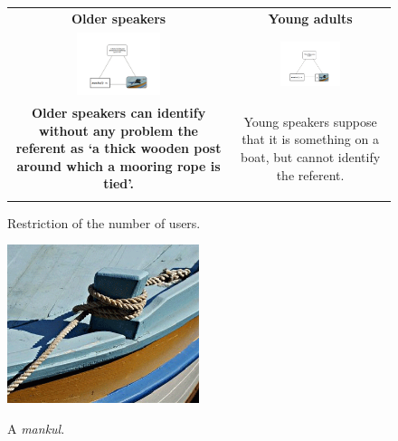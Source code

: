\documentclass[output=paper]{LSP/langsci}
\begin{document}
\begin{figure}
\begin{tabular}{cc}
\lsptoprule
{\bfseries Older speakers} & {\bfseries Young adults}\\
\includegraphics[width=0.4\textwidth]{illustrations/skevin_fig31} & \includegraphics[width=0.4\textwidth]{illustrations/skevin_fig32}\\
\begin{minipage}[t]{0.4\textwidth}{\bfseries Older speakers can identify without any problem the referent as  `a thick wooden post around which a mooring rope is tied'.}\end{minipage} & 
\begin{minipage}[t]{0.4\textwidth}Young speakers suppose that it is something on a boat, but cannot identify the referent.\end{minipage}\\
\lspbottomrule
\end{tabular}
\caption{Restriction of the number of users.}
\label{fig:3}
\end{figure}

\begin{figure}
\includegraphics[width=0.5\textwidth]{illustrations/skevin_fig3_mankul}
\label{fig3_mankul}
\caption{A \textit{mankul}.}
\end{figure}
\end{document}
